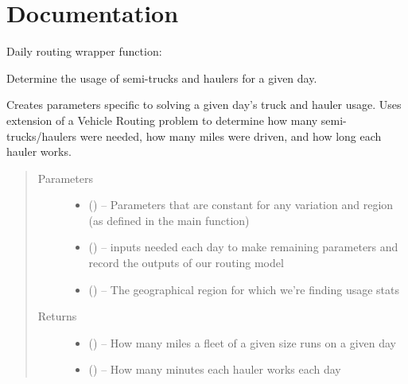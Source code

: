 \documentclass[letterpaper,10pt,english]{sphinxmanual}
\begin{document}
\section{Documentation}
\label{\detokenize{daily-routing:documentation}}
Daily routing wrapper function:

\begin{fulllineitems}
\label{\detokenize{daily-routing:iterate.solve_day}}
Determine the usage of semi-trucks and haulers for a given day.

Creates parameters specific to solving a given day's truck and hauler usage.
Uses extension of a Vehicle Routing problem to determine how many
semi-trucks/haulers were needed, how many miles were driven, and how long
each hauler works.
\begin{quote}\begin{description}
\item[{Parameters}] \leavevmode\begin{itemize}
\item {} 
 () -- Parameters that are constant for any variation and region (as defined
in the main function)

\item {} 
 () -- inputs needed each day to make remaining parameters and record the
outputs of our routing model

\item {} 
 () -- The geographical region for which we're finding usage stats

\end{itemize}

\item[{Returns}] \leavevmode
\begin{itemize}
\item {} 
 () -- How many miles a fleet of a given size runs on a given day

\item {} 
 () -- How many minutes each hauler works each day

\end{itemize}


\end{description}\end{quote}

\end{fulllineitems}
\end{document}
